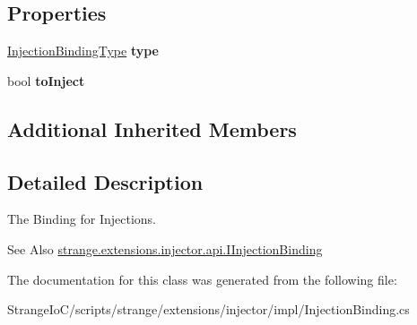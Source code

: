 \subsection*{Properties}
\begin{DoxyCompactItemize}
\item 
\hypertarget{classstrange_1_1extensions_1_1injector_1_1impl_1_1_injection_binding_a915f5c97eceb69c2d893e8874cc255d1}{\hyperlink{namespacestrange_1_1extensions_1_1injector_1_1api_aaf5414484d7eccb5c502984bd70549ae}{Injection\-Binding\-Type} {\bfseries type}}\label{classstrange_1_1extensions_1_1injector_1_1impl_1_1_injection_binding_a915f5c97eceb69c2d893e8874cc255d1}

\item 
\hypertarget{classstrange_1_1extensions_1_1injector_1_1impl_1_1_injection_binding_aeb55d17167b209c72042d67dee584070}{bool {\bfseries to\-Inject}}\label{classstrange_1_1extensions_1_1injector_1_1impl_1_1_injection_binding_aeb55d17167b209c72042d67dee584070}

\end{DoxyCompactItemize}
\subsection*{Additional Inherited Members}


\subsection{Detailed Description}
The Binding for Injections. 

\begin{DoxySeeAlso}{See Also}
\hyperlink{interfacestrange_1_1extensions_1_1injector_1_1api_1_1_i_injection_binding}{strange.\-extensions.\-injector.\-api.\-I\-Injection\-Binding} 
\end{DoxySeeAlso}


The documentation for this class was generated from the following file\-:\begin{DoxyCompactItemize}
\item 
Strange\-Io\-C/scripts/strange/extensions/injector/impl/Injection\-Binding.\-cs\end{DoxyCompactItemize}
